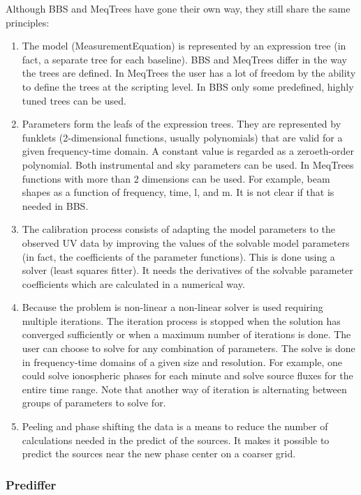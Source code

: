 \documentclass[10pt]{lofar}
\begin{document}
Although BBS and MeqTrees have gone their own way, they still share the same principles:
\begin{enumerate}
\item The model (MeasurementEquation) is represented by an expression tree (in fact, a separate tree for each baseline). BBS and MeqTrees differ in the way the trees are defined. In MeqTrees the user has a lot of freedom by the ability to define the trees at the scripting level. In BBS only some predefined, highly tuned trees can be used.
\item Parameters form the leafs of the expression trees. They are represented by funklets (2-dimensional functions, usually polynomials) that are valid for a given frequency-time domain. A constant value is regarded as a zeroeth-order polynomial. Both instrumental and sky parameters can be used.
In MeqTrees functions with more than 2 dimensions can be used. For example, beam shapes as a function of frequency, time, l, and m. It is not clear if that is needed in BBS.
\item The calibration process consists of adapting the model parameters to the observed UV data by improving the values of the solvable model parameters (in fact, the coefficients of the parameter functions). This is done using a solver (least squares fitter). It needs the derivatives of the solvable parameter coefficients which are calculated in a numerical way.
\item Because the problem is non-linear a non-linear solver is used requiring multiple iterations. The iteration process is stopped when the solution has converged sufficiently or when a maximum number of iterations is done.
The user can choose to solve for any combination of parameters. The solve is done in frequency-time domains of a given size and resolution. For example, one could solve ionospheric phases for each minute and solve source fluxes for the entire time range.
Note that another way of iteration is alternating between groups of parameters to solve for.
\item Peeling and phase shifting the data is a means to reduce the number of calculations needed in the predict of the sources. It makes it possible to predict the sources near the new phase center on a coarser grid.
\end{enumerate}

\subsubsection{Prediffer}
\label{subsubsec:design-prediffer}
\end{document}
